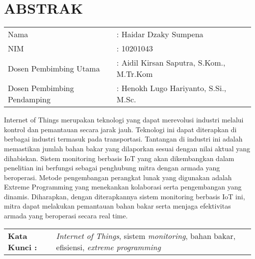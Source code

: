 \chapter*{ABSTRAK}
\begin{table}[h]
    \begin{tabular}
        { 
            p{} 
            p{}
            }
            \\
            Nama & : Haidar Dzaky Sumpena
            \\
            NIM & : 10201043
            \\
            Dosen Pembimbing Utama & 
            : Aidil Kirsan Saputra, S.Kom., M.Tr.Kom
            \\
            Dosen Pembimbing Pendamping & 
            : Henokh Lugo Hariyanto, S.Si., M.Sc.
        \end{tabular}
    \end{table}

Internet of Things merupakan teknologi yang dapat merevolusi industri melalui kontrol dan pemantauan secara jarak jauh. Teknologi ini dapat diterapkan di berbagai industri termasuk pada transportasi. Tantangan di industri ini adalah memastikan jumlah bahan bakar yang dilaporkan sesuai dengan nilai aktual yang dihabiskan. Sistem monitoring berbasis IoT yang akan dikembangkan dalam penelitian ini berfungsi sebagai penghubung mitra dengan armada yang beroperasi. Metode pengembangan perangkat lunak yang digunakan adalah Extreme Programming yang menekankan kolaborasi serta pengembangan yang dinamis. Diharapkan, dengan diterapkannya sistem monitoring berbasis IoT ini, mitra dapat melakukan pemantauan bahan bakar serta menjaga efektivitas armada yang beroperasi secara real time.


\begin{table}[h]
    \begin{tabular}{ p{} p{} }
        \\
        \textbf{Kata Kunci :} & \textit{Internet of Things}, sistem \textit{monitoring}, bahan bakar, efisiensi, \textit{extreme programming}
    \end{tabular}
\end{table}
